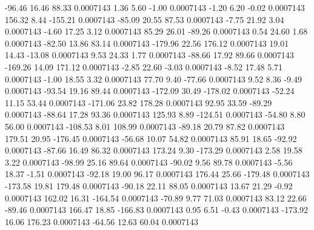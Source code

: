       -96.46       16.46       88.33     0.0007143
        1.36        5.60       -1.00     0.0007143
       -1.20        6.20       -0.02     0.0007143
      156.32        8.44     -155.21     0.0007143
      -85.09       20.55       87.53     0.0007143
       -7.75       21.92        3.04     0.0007143
       -4.60       17.25        3.12     0.0007143
       85.29       26.01      -89.26     0.0007143
        0.54       24.60        1.68     0.0007143
      -82.50       13.86       83.14     0.0007143
     -179.96       22.56      176.12     0.0007143
       19.01       14.43      -13.08     0.0007143
        9.53       24.33        1.77     0.0007143
      -88.66       17.92       89.66     0.0007143
     -169.26       14.09      171.12     0.0007143
       -2.85       22.60       -3.03     0.0007143
       -8.52       17.48        5.71     0.0007143
       -1.00       18.55        3.32     0.0007143
       77.70        9.40      -77.66     0.0007143
        9.52        8.36       -9.49     0.0007143
      -93.54       19.16       89.44     0.0007143
     -172.09       30.49     -178.02     0.0007143
      -52.24       11.15       53.44     0.0007143
     -171.06       23.82      178.28     0.0007143
       92.95       33.59      -89.29     0.0007143
      -88.64       17.28       93.36     0.0007143
      125.93        8.89     -124.51     0.0007143
      -54.80        8.80       56.00     0.0007143
     -108.53        8.01      108.99     0.0007143
      -89.18       20.79       87.82     0.0007143
      179.51       20.95     -176.45     0.0007143
      -56.68       10.07       54.82     0.0007143
       85.91       18.65      -92.92     0.0007143
      -87.66       16.49       86.32     0.0007143
      173.24        9.30     -173.29     0.0007143
        2.58       19.58        3.22     0.0007143
      -98.99       25.16       89.64     0.0007143
      -90.02        9.56       89.78     0.0007143
       -5.56       18.37       -1.51     0.0007143
      -92.18       19.00       96.17     0.0007143
      176.44       25.66     -179.48     0.0007143
     -173.58       19.81      179.48     0.0007143
      -90.18       22.11       88.05     0.0007143
       13.67       21.29       -0.92     0.0007143
      162.02       16.31     -164.54     0.0007143
      -70.89        9.77       71.03     0.0007143
       83.12       22.66      -89.46     0.0007143
      166.47       18.85     -166.83     0.0007143
        0.95        6.51       -0.43     0.0007143
     -173.92       16.06      176.23     0.0007143
      -64.56       12.63       60.04     0.0007143
